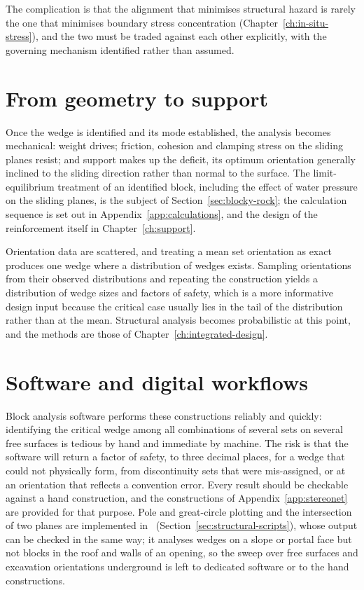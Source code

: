 The complication is that the alignment
that minimises structural hazard is rarely the one that minimises boundary
stress concentration (Chapter~\ref{ch:in-situ-stress}), and the two must be
traded against each other explicitly, with the governing mechanism identified
rather than assumed.

\section{From geometry to support}
\label{sec:geometry-to-support}

Once the wedge is identified and its mode established, the analysis becomes
mechanical: weight drives; friction, cohesion and clamping stress on the
sliding planes resist; and support makes up the deficit, its optimum
orientation generally inclined to the sliding direction rather than normal to
the surface. The limit-equilibrium treatment of an identified block,
including the effect of water pressure on the sliding planes, is the subject
of Section~\ref{sec:blocky-rock}; the calculation sequence is set out in
Appendix~\ref{app:calculations}, and the design of the reinforcement itself in
Chapter~\ref{ch:support}.

Orientation data are scattered, and treating a mean set orientation as exact
produces one wedge where a distribution of wedges exists. Sampling orientations
from their observed distributions and repeating the construction yields a
distribution of wedge sizes and factors of safety, which is a
more informative design input because the critical case usually lies
in the tail of the distribution rather than at the mean. Structural
analysis becomes probabilistic at this point, and the methods are those of
Chapter~\ref{ch:integrated-design}.

\section{Software and digital workflows}
\label{sec:structural-software}

Block analysis software performs these constructions reliably and quickly:
identifying the critical wedge among all
combinations of several sets on several free surfaces is tedious by hand and
immediate by machine. The risk is that the software will return a
factor of safety, to three decimal places, for a wedge that could not
physically form, from discontinuity sets that were mis-assigned, or at an
orientation that reflects a convention error. Every
result should be checkable against a hand construction, and the constructions of
Appendix~\ref{app:stereonet} are provided for that purpose. Pole and great-circle plotting and the
intersection of two planes are implemented in \companionname\
(Section~\ref{sec:structural-scripts}), whose output can be checked in the
same way; it analyses wedges on a slope or portal face but not blocks in the
roof and walls of an opening, so the sweep over free surfaces and excavation
orientations underground is left to dedicated software or to the hand
constructions.

